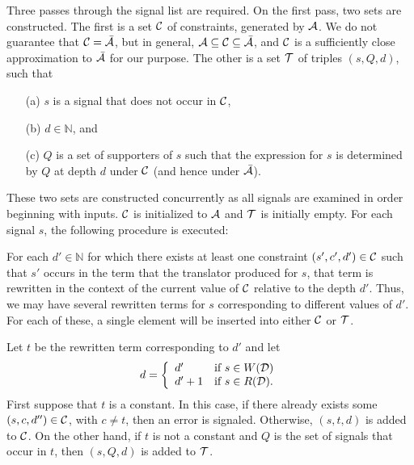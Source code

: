 \documentclass{article}
\begin{document}
Three passes through the signal list are required.  On the first pass,
two sets are constructed.  The first is a set ${\cal C}$ of
constraints, generated by ${\cal A}$.  We do not guarantee that ${\cal
C} = \bar{\cal A}$, but in general, ${\cal A} \subseteq {\cal C}
\subseteq \bar{\cal A}$, and ${\cal C}$ is a sufficiently close
approximation to $\bar{\cal A}$ for our purpose.  The other is a set
${\cal T}$ of triples $(s,Q,d)$, such that

\begin{enumerate}

\item[(a)]  $s$ is a signal that does not occur in ${\cal C}$, 

\item[(b)] $d \in {\mathbb N}$, and 

\item[(c)] $Q$ is a set of supporters of $s$ such that the expression
for $s$ is determined by $Q$ at depth $d$ under ${\cal C}$ (and hence
under $\bar{\cal A}$).

\end{enumerate}
These two sets are constructed concurrently as all signals are
examined in order beginning with inputs.  ${\cal C}$ is initialized to
${\cal A}$ and ${\cal T}$ is initially empty.  For each signal $s$,
the following procedure is executed:

For each $d' \in {\mathbb N}$ for which there exists at least one
constraint $(s',c',d') \in {\cal C}$ such that $s'$ occurs in the term
that the translator produced for $s$, that term is rewritten in the
context of the current value of ${\cal C}$ relative to the depth $d'$.
Thus, we may have several rewritten terms for $s$ corresponding to
different values of $d'$.  For each of these, a single element will be
inserted into either ${\cal C}$ or ${\cal T}$.

Let $t$ be the rewritten term corresponding to $d'$ and let
\[d = \left\{\begin{array}{ll}
         d' & \mbox{if $s \in W({\cal D})$}\\
         d'+1 & \mbox{if $s \in R({\cal D})$}. \end{array} \right. \]
First suppose that $t$ is a constant.  In this case, if there already
exists some $(s,c,d'') \in {\cal C}$, with $c \neq t$, then an error
is signaled.  Otherwise, $(s,t,d)$ is added to ${\cal C}$.  On the
other hand, if $t$ is not a constant and $Q$ is the set of signals
that occur in $t$, then $(s,Q,d)$ is added to ${\cal T}$.
\end{document}
